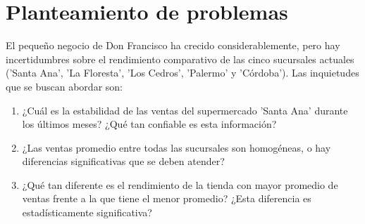 
\section{Planteamiento de problemas}

\begin{flushleft}
    El pequeño negocio de Don Francisco ha crecido considerablemente, pero hay incertidumbres sobre el rendimiento comparativo de las cinco sucursales actuales ('Santa Ana', 'La Floresta', 'Los Cedros', 'Palermo' y 'Córdoba'). Las inquietudes que se buscan abordar son:
\end{flushleft}

\begin{enumerate}
    \item ¿Cuál es la estabilidad de las ventas del supermercado 'Santa Ana' durante los últimos meses? ¿Qué tan confiable es esta información?
    \item ¿Las ventas promedio entre todas las sucursales son homogéneas, o hay diferencias significativas que se deben atender?
    \item ¿Qué tan diferente es el rendimiento de la tienda con mayor promedio de ventas frente a la que tiene el menor promedio? ¿Esta diferencia es estadísticamente significativa?
\end{enumerate}